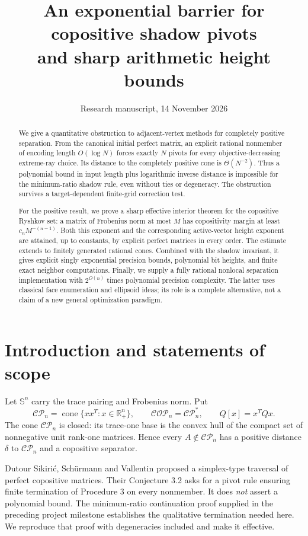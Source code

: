 \documentclass[11pt]{article}
\title{An exponential barrier for copositive shadow pivots\\and sharp arithmetic height bounds}
\author{}
\date{Research manuscript, 14 November 2026}
\theoremstyle{remark}\newtheorem{remark}[theorem]{Remark}
\newcommand{\CP}{\mathcal{CP}}
\newcommand{\COP}{\mathcal{COP}}
\newcommand{\cone}{\operatorname{cone}}
\begin{document}
\maketitle
\begin{abstract}
We give a quantitative obstruction to adjacent-vertex methods for completely positive separation. From the canonical initial perfect matrix, an explicit rational nonmember of encoding length $O(\log N)$ forces exactly $N$ pivots for every objective-decreasing extreme-ray choice. Its distance to the completely positive cone is $\Theta(N^{-2})$. Thus a polynomial bound in input length plus logarithmic inverse distance is impossible for the minimum-ratio shadow rule, even without ties or degeneracy. The obstruction survives a target-dependent finite-grid correction test.

For the positive result, we prove a sharp effective interior theorem for the copositive Ryshkov set: a matrix of Frobenius norm at most $M$ has copositivity margin at least $c_n M^{-(n-1)}$. Both this exponent and the corresponding active-vector height exponent are attained, up to constants, by explicit perfect matrices in every order. The estimate extends to finitely generated rational cones. Combined with the shadow invariant, it gives explicit singly exponential precision bounds, polynomial bit heights, and finite exact neighbor computations. Finally, we supply a fully rational nonlocal separation implementation with $2^{O(n)}$ times polynomial precision complexity. The latter uses classical face enumeration and ellipsoid ideas; its role is a complete alternative, not a claim of a new general optimization paradigm.
\end{abstract}

\section{Introduction and statements of scope}
Let $\mathbb S^n$ carry the trace pairing and Frobenius norm. Put
\[
 \CP_n=\cone\{xx^T:x\in\mathbb R_+^n\},\qquad
 \COP_n=\CP_n^*,\qquad Q[x]=x^TQx.
\]
The cone $\CP_n$ is closed: its trace-one base is the convex hull of the compact set of nonnegative unit rank-one matrices. Hence every $A\notin\CP_n$ has a positive distance $\delta$ to $\CP_n$ and a copositive separator.

Dutour Sikiri\'c, Sch\"urmann and Vallentin \cite{DSV21} proposed a simplex-type traversal of perfect copositive matrices. Their Conjecture 3.2 asks for a pivot rule ensuring finite termination of Procedure 3 on every nonmember. It does \emph{not} assert a polynomial bound. The minimum-ratio continuation proof supplied in the preceding project milestone \cite{M37} establishes the qualitative termination needed here. We reproduce that proof with degeneracies included and make it effective.
\end{document}
